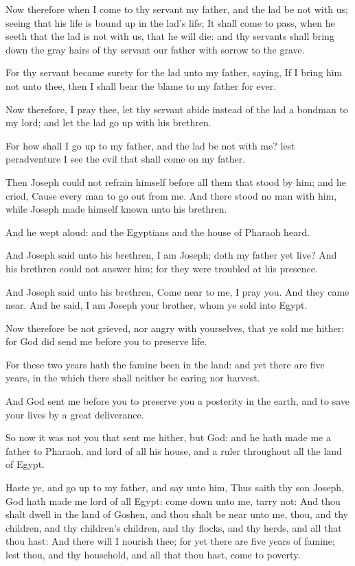\Verse Now therefore when I come to thy servant my father, and the lad be not with us; seeing that his life is bound up in the lad's life; \Verse It shall come to pass, when he seeth that the lad is not with us, that he will die: and thy servants shall bring down the gray hairs of thy servant our father with sorrow to the grave.

\Verse For thy servant became surety for the lad unto my father, saying, If I bring him not unto thee, then I shall bear the blame to my father for ever.

\Verse Now therefore, I pray thee, let thy servant abide instead of the lad a bondman to my lord; and let the lad go up with his brethren.

\Verse For how shall I go up to my father, and the lad be not with me?  lest peradventure I see the evil that shall come on my father.

\Chapter
\Verse Then Joseph could not refrain himself before all them that stood by him; and he cried, Cause every man to go out from me. And there stood no man with him, while Joseph made himself known unto his brethren.

\Verse And he wept aloud: and the Egyptians and the house of Pharaoh heard.

\Verse And Joseph said unto his brethren, I am Joseph; doth my father yet live? And his brethren could not answer him; for they were troubled at his presence.

\Verse And Joseph said unto his brethren, Come near to me, I pray you.  And they came near. And he said, I am Joseph your brother, whom ye sold into Egypt.

\Verse Now therefore be not grieved, nor angry with yourselves, that ye sold me hither: for God did send me before you to preserve life.

\Verse For these two years hath the famine been in the land: and yet there are five years, in the which there shall neither be earing nor harvest.

\Verse And God sent me before you to preserve you a posterity in the earth, and to save your lives by a great deliverance.

\Verse So now it was not you that sent me hither, but God: and he hath made me a father to Pharaoh, and lord of all his house, and a ruler throughout all the land of Egypt.

\Verse Haste ye, and go up to my father, and say unto him, Thus saith thy son Joseph, God hath made me lord of all Egypt: come down unto me, tarry not: \Verse And thou shalt dwell in the land of Goshen, and thou shalt be near unto me, thou, and thy children, and thy children's children, and thy flocks, and thy herds, and all that thou hast: \Verse And there will I nourish thee; for yet there are five years of famine; lest thou, and thy household, and all that thou hast, come to poverty.


